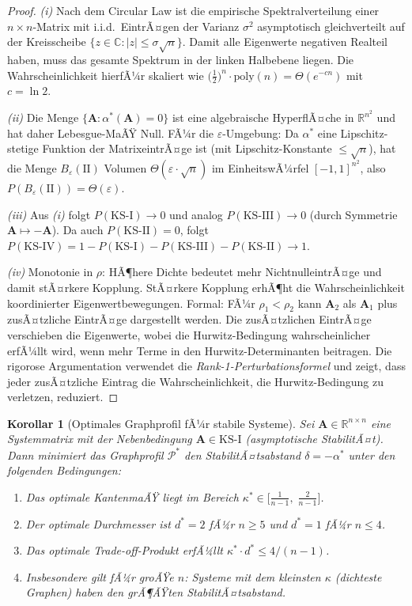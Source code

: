 ﻿\documentclass[12pt, a4paper, titlepage]{report}
\newtheorem{corollary}[theorem]{Korollar}
\theoremstyle{definition}
\theoremstyle{remark}
\newcommand{\R}{\mathbb{R}}
\newcommand{\C}{\mathbb{C}}
\newcommand{\vA}{\bm{A}}
\newcommand{\KS}{\mathrm{KS}}
\begin{document}
\begin{proof}
\textit{(i)} Nach dem Circular Law ist die empirische Spektralverteilung einer
$n \times n$-Matrix mit i.i.d.\ EintrÃ¤gen der Varianz $\sigma^2$ asymptotisch
gleichverteilt auf der Kreisscheibe $\{z \in \C : |z| \leq \sigma\sqrt{n}\}$.
Damit alle Eigenwerte negativen Realteil haben, muss das gesamte Spektrum in der
linken Halbebene liegen. Die Wahrscheinlichkeit hierfÃ¼r skaliert wie
$\bigl(\frac{1}{2}\bigr)^n \cdot \mathrm{poly}(n) = \Theta(e^{-cn})$ mit
$c = \ln 2$.

\textit{(ii)} Die Menge $\{\vA : \alpha^*(\vA) = 0\}$ ist eine algebraische
HyperflÃ¤che in $\R^{n^2}$ und hat daher Lebesgue-MaÃŸ Null. FÃ¼r die
$\varepsilon$-Umgebung: Da $\alpha^*$ eine Lipschitz-stetige Funktion der
MatrixeintrÃ¤ge ist (mit Lipschitz-Konstante $\leq \sqrt{n}$), hat die Menge
$B_\varepsilon(\mathrm{II})$ Volumen $\Theta(\varepsilon \cdot \sqrt{n})$
im EinheitswÃ¼rfel $[-1,1]^{n^2}$, also
$P(B_\varepsilon(\mathrm{II})) = \Theta(\varepsilon)$.

\textit{(iii)} Aus \textit{(i)} folgt $P(\KS\text{-I}) \to 0$ und analog
$P(\KS\text{-III}) \to 0$ (durch Symmetrie $\vA \mapsto -\vA$). Da auch
$P(\KS\text{-II}) = 0$, folgt $P(\KS\text{-IV}) = 1 - P(\KS\text{-I}) -
P(\KS\text{-III}) - P(\KS\text{-II}) \to 1$.

\textit{(iv)} Monotonie in $\rho$: HÃ¶here Dichte bedeutet mehr NichtnulleintrÃ¤ge
und damit stÃ¤rkere Kopplung. StÃ¤rkere Kopplung erhÃ¶ht die Wahrscheinlichkeit
koordinierter Eigenwertbewegungen. Formal: FÃ¼r $\rho_1 < \rho_2$ kann $\vA_2$ als
$\vA_1$ plus zusÃ¤tzliche EintrÃ¤ge dargestellt werden. Die zusÃ¤tzlichen EintrÃ¤ge
verschieben die Eigenwerte, wobei die Hurwitz-Bedingung wahrscheinlicher erfÃ¼llt wird,
wenn mehr Terme in den Hurwitz-Determinanten beitragen. Die rigorose Argumentation
verwendet die \emph{Rank-1-Perturbationsformel} und zeigt, dass jeder zusÃ¤tzliche
Eintrag die Wahrscheinlichkeit, die Hurwitz-Bedingung zu verletzen, reduziert.
\end{proof}

\begin{corollary}[Optimales Graphprofil fÃ¼r stabile Systeme]
\label{cor:opt_stabil}
Sei $\vA \in \R^{n \times n}$ eine Systemmatrix mit der Nebenbedingung
$\vA \in \KS\text{-I}$ (asymptotische StabilitÃ¤t). Dann minimiert das Graphprofil
$\mathcal{P}^*$ den StabilitÃ¤tsabstand $\delta = -\alpha^*$ unter den folgenden
Bedingungen:
\begin{enumerate}[label=(\roman*)]
  \item Das optimale KantenmaÃŸ liegt im Bereich
    $\kappa^* \in \bigl[\frac{1}{n-1},\; \frac{2}{n-1}\bigr]$.
  \item Der optimale Durchmesser ist $d^* = 2$ fÃ¼r $n \geq 5$ und $d^* = 1$
    fÃ¼r $n \leq 4$.
  \item Das optimale Trade-off-Produkt erfÃ¼llt
    $\kappa^* \cdot d^* \leq 4/(n-1)$.
  \item Insbesondere gilt fÃ¼r groÃŸe $n$: Systeme mit dem kleinsten $\kappa$ (dichteste
    Graphen) haben den grÃ¶ÃŸten StabilitÃ¤tsabstand.
\end{enumerate}
\end{corollary}
\end{document}
